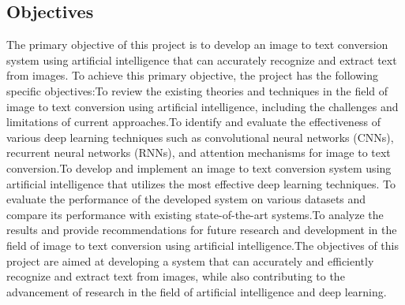 \subsection{Objectives}
The primary objective of this project is to develop an image to text conversion system using artificial intelligence that can accurately recognize and extract text from images. To achieve this primary objective, the project has the following specific objectives:To review the existing theories and techniques in the field of image to text conversion using artificial intelligence, including the challenges and limitations of current approaches.To identify and evaluate the effectiveness of various deep learning techniques such as convolutional neural networks (CNNs), recurrent neural networks (RNNs), and attention mechanisms for image to text conversion.To develop and implement an image to text conversion system using artificial intelligence that utilizes the most effective deep learning techniques.
To evaluate the performance of the developed system on various datasets and compare its performance with existing state-of-the-art systems.To analyze the results and provide recommendations for future research and development in the field of image to text conversion using artificial intelligence.The objectives of this project are aimed at developing a system that can accurately and efficiently recognize and extract text from images, while also contributing to the advancement of research in the field of artificial intelligence and deep learning.

